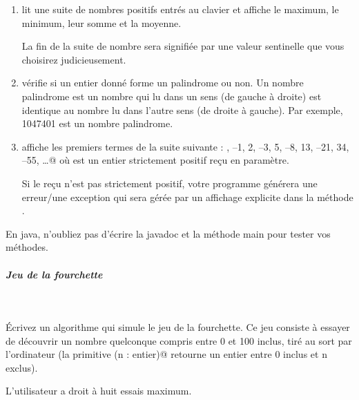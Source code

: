 \documentclass[11pt,a4paper]{article}
\begin{document}
\begin{enumerate}
			\item 
              lit une suite de nombres positifs entr\'es au clavier et affiche
              le maximum, le minimum, leur somme et la moyenne. \par
				
              La fin de la suite de nombre sera signifi\'ee par une valeur sentinelle que vous choisirez
              judicieusement.
            
			\item 
              v\'erifie si un entier donn\'e forme un palindrome ou non. Un nombre
              palindrome est un nombre qui lu dans un sens (de gauche \`a droite) est identique au nombre
              lu dans l'autre sens (de droite \`a gauche). Par exemple, 1047401 est un nombre palindrome.
            
			\item 
                affiche les \verb@n@ premiers termes de la suite suivante : 
                , –1, 2, –3, 5, –8, 13, –21, 34, –55, …@
                o\`u \verb@n@ est un entier strictement positif re\c cu en param\`etre.\par
				
                Si le \verb@n@ re\c cu n'est pas strictement positif, votre programme g\'en\'erera une erreur/une exception 
                qui sera g\'er\'ee par un affichage explicite dans la m\'ethode \verb@main@.
            
					\end{enumerate}
				
            \par
        En java, n'oubliez pas d'\'ecrire la javadoc et la m\'ethode main pour tester vos m\'ethodes.
            \par
        
			
		\subparagraph{Jeu de la fourchette} 
		
					\textcolor{white}{.} \par
				
          \'Ecrivez un algorithme qui simule le jeu de la fourchette. Ce jeu consiste \`a essayer de d\'ecouvrir
          un nombre quelconque compris entre 0 et 100 inclus, tir\'e au sort par l'ordinateur (la primitive
          \verb@hasard(n : entier)@ retourne un entier entre 0 inclus et n exclus). \par
				
          L'utilisateur a droit \`a huit essais maximum.\par
				
\end{document}

